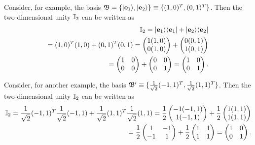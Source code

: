 {\color{blue}
\bexample
Consider, for example, the basis
${\frak B}=\{ \vert {\bf e}_1 \rangle , \vert {\bf e}_2 \rangle \} \equiv \{(1,0)^T,(0,1)^T\}$.
Then the two-dimensional unity ${\Bbb I}_2$
can be written as
\begin{equation}
\begin{split}
{\Bbb I}_2 =   \vert {\bf e}_1 \rangle \langle  {\bf e}_1 \vert   +     \vert {\bf e}_2 \rangle  \langle  {\bf e}_2 \vert \\
=   (1,0)^T (1,0) +   (0,1)^T (0,1)
=
\begin{pmatrix}
1 (1,0) \\  0 (1,0)
\end{pmatrix}
 +
\begin{pmatrix}
0 (0,1)\\
1 (0,1)
\end{pmatrix} \\
 =
\begin{pmatrix}
1 & 0 \\
0 & 0
\end{pmatrix}
+
\begin{pmatrix}
0 & 0 \\
0 & 1
\end{pmatrix}
=
\begin{pmatrix}
1 & 0 \\
0 & 1
\end{pmatrix}
.
\end{split}
\end{equation}

Consider, for another example, the basis
${\frak B}' \equiv \{\frac{1}{\sqrt{2}}(-1,1)^T,\frac{1}{\sqrt{2}}(1,1)^T\}$.
Then the two-dimensional unity ${\Bbb I}_2$
can be written as
\begin{equation}
\begin{split}
{\Bbb I}_2 =  \frac{1}{\sqrt{2}}   (-1,1)^T  \frac{1}{\sqrt{2}}(-1,1) +   \frac{1}{\sqrt{2}}(1,1)^T \frac{1}{\sqrt{2}}(1,1)
=
\frac{1}{{2}}
\begin{pmatrix}
-1 (-1,1) \\  1 (-1,1)
\end{pmatrix}
 +
\frac{1}{{2}}
\begin{pmatrix}
1 (1,1)\\
1 (1,1)
\end{pmatrix} \\
 =
\frac{1}{{2}}
\begin{pmatrix}
1 & -1 \\
-1 & 1
\end{pmatrix}
+
\frac{1}{{2}}
\begin{pmatrix}
1 & 1 \\
1 & 1
\end{pmatrix}
=
\begin{pmatrix}
1 & 0 \\
0 & 1
\end{pmatrix}
.
\end{split}
\end{equation}


\eexample
}


